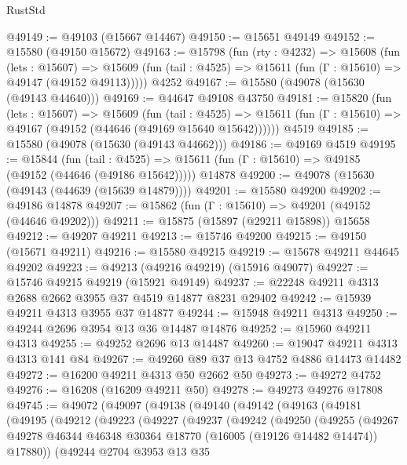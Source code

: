 \begin{lexlean}{RustStd}
\begin{coremodule}
@49149 := @49103 (@15667 @14467)
@49150 := @15651 @49149
@49152 := @15580 (@49150 @15672)
@49163 := @15798
    (fun (rty : @4232) =>
    @15608
      (fun (lets : @15607) =>
      @15609 (fun (tail : @4525) => @15611 (fun (Γ : @15610) => @49147 (@49152 @49113)))))
    @4252
@49167 := @15580 (@49078 (@15630 (@49143 @44640)))
@49169 := @44647 @49108 @43750
@49181 := @15820
    (fun (lets : @15607) =>
    @15609
      (fun (tail : @4525) =>
      @15611 (fun (Γ : @15610) => @49167 (@49152 (@44646 (@49169 @15640 @15642))))))
    @4519
@49185 := @15580 (@49078 (@15630 (@49143 @44662)))
@49186 := @49169 @4519
@49195 := @15844
    (fun (tail : @4525) => @15611 (fun (Γ : @15610) => @49185 (@49152 (@44646 (@49186 @15642)))))
    @14878
@49200 := @49078 (@15630 (@49143 (@44639 (@15639 @14879))))
@49201 := @15580 @49200
@49202 := @49186 @14878
@49207 := @15862 (fun (Γ : @15610) => @49201 (@49152 (@44646 @49202)))
@49211 := @15875 (@15897 (@29211 @15898)) @15658
@49212 := @49207 @49211
@49213 := @15746 @49200
@49215 := @49150 (@15671 @49211)
@49216 := @15580 @49215
@49219 := @15678 @49211 @44645 @49202
@49223 := @49213 (@49216 @49219) (@15916 @49077)
@49227 := @15746 @49215 @49219 (@15921 @49149)
@49237 := @22248 @49211 @4313 @2688 @2662 @3955 @37 @4519 @14877 @8231 @29402
@49242 := @15939 @49211 @4313 @3955 @37 @14877
@49244 := @15948 @49211 @4313
@49250 := @49244 @2696 @3954 @13 @36 @14487 @14876
@49252 := @15960 @49211 @4313
@49255 := @49252 @2696 @13 @14487
@49260 := @19047 @49211 @4313 @4313 @141 @84
@49267 := @49260 @89 @37 @13 @4752 @4886 @14473 @14482
@49272 := @16200 @49211 @4313 @50 @2662 @50
@49273 := @49272 @4752
@49276 := @16208 (@16209 @49211 @50)
@49278 := @49273 @49276 @17808
@49745 := @49072
    (@49097
      (@49138
        (@49140
          (@49142
            (@49163
              (@49181
                (@49195
                  (@49212
                    (@49223
                      (@49227
                        (@49237
                          (@49242
                            (@49250
                              (@49255
                                (@49267
                                  @49278
                                  @46344
                                  @46348
                                  @30364
                                  @18770
                                  (@16005 (@19126 @14482 @14474))
                                  @17880))
                              (@49244
                                @2704
                                @3953
                                @13
                                @35

\end{coremodule}
\end{lexlean}
